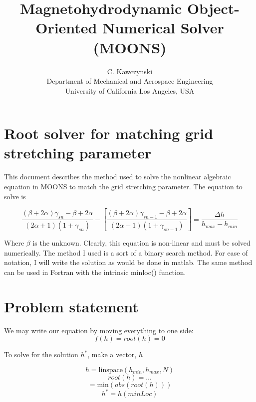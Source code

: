 \documentclass[11pt]{article}
\begin{document}
\doublespacing
\title{Magnetohydrodynamic Object-Oriented Numerical Solver (MOONS)}
\author{C. Kawczynski \\
Department of Mechanical and Aerospace Engineering \\
University of California Los Angeles, USA\\
}
\maketitle

\section{Root solver for matching grid stretching parameter}

This document describes the method used to solve the nonlinear algebraic equation in MOONS to match the grid stretching parameter. The equation to solve is 

\begin{equation}
	\frac{(\beta+2\alpha)\gamma_{sn} - \beta + 2\alpha}{(2\alpha+1)(1+\gamma_{sn})}
	-
	\left[
	\frac{(\beta+2\alpha)\gamma_{sn-1} - \beta + 2\alpha}{(2\alpha+1)(1+\gamma_{sn-1})}
	\right]
	=
	\frac{\Delta h}{h_{max}-h_{min}}
\end{equation}

Where $\beta$ is the unknown. Clearly, this equation is non-linear and must be solved numerically. The method I used is a sort of a binary search method. For ease of notation, I will write the solution as would be done in matlab. The same method can be used in Fortran with the intrinsic minloc() function.

\section{Problem statement}
We may write our equation by moving everything to one side:
\begin{equation}
	f(h) = root(h) = 0
\end{equation}

To solve for the solution $h^*$, make a vector, $h$

\begin{equation}
	h = \text{linspace}(h_{min},h_{max},N)
\end{equation}
\begin{equation}
	root(h) = \ldots
\end{equation}
\begin{equation}
	[\text{minVal} \, \text{minLoc}] = \text{min}(abs(root(h)))
\end{equation}
\begin{equation}
	h^* = h(minLoc)
\end{equation}
\end{document}
